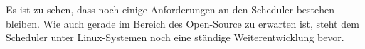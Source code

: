 \documentclass[ngerman]{seminarvorlage}
\begin{document}
Es ist zu sehen, dass noch einige Anforderungen an den Scheduler bestehen bleiben.
Wie auch gerade im Bereich des Open-Source zu erwarten ist, steht dem Scheduler unter Linux-Systemen noch eine ständige Weiterentwicklung bevor.  


\pagebreak

%
%


\end{document}
